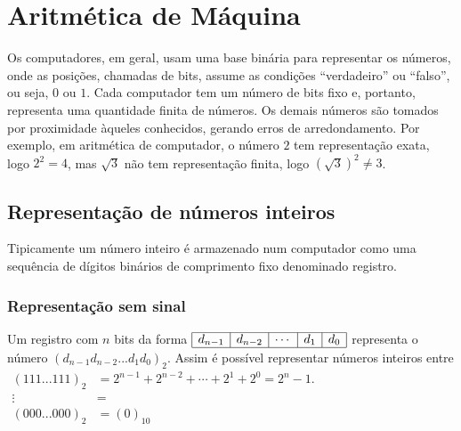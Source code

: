 \section{Aritmética de Máquina}
Os computadores, em geral, usam uma base binária para representar os números, onde as posições, chamadas de bits, assume as condições ``verdadeiro'' ou ``falso'', ou seja, $0$ ou $1$. Cada computador tem um número de bits fixo e, portanto, representa uma quantidade finita de números. Os demais números são tomados por proximidade àqueles conhecidos, gerando erros de arredondamento. Por exemplo, em aritmética de computador, o número $2$ tem representação exata, logo $2^2=4$, mas $\sqrt{3}$ não tem representação finita, logo $(\sqrt{3})^2\neq 3$.



\subsection{Representação de números inteiros}

Tipicamente um número inteiro é armazenado num computador como uma sequência de dígitos binários de comprimento fixo denominado registro.

\subsubsection{Representação sem sinal}
Um registro com $n$ bits da forma
$
\begin{array}{|c|c|c|c|c|} \hline
d_{n-1}&d_{n-2}&\cdots&d_1&d_0\\\hline
\end{array}
$
representa o número $(d_{n-1}d_{n-2}...d_1d_0)_2$. Assim é possível representar números inteiros entre
$
\begin{array}{cl}
  (111...111)_2 & = 2^{n-1}+2^{n-2}+\cdots+2^1+2^0=2^n-1.\\
    \vdots      & = \\
  (000...000)_2 & = (0)_{10} \\
\end{array}
$


